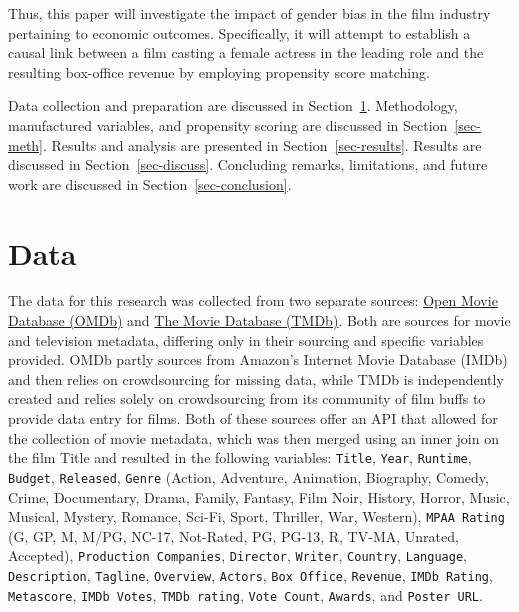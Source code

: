\documentclass[
]{agujournal2019}
\begin{document}
Thus, this paper will investigate the impact of gender bias in the film
industry pertaining to economic outcomes. Specifically, it will attempt
to establish a causal link between a film casting a female actress in
the leading role and the resulting box-office revenue by employing
propensity score matching.

Data collection and preparation are discussed in Section~\ref{sec-data}.
Methodology, manufactured variables, and propensity scoring are
discussed in Section~\ref{sec-meth}. Results and analysis are presented
in Section~\ref{sec-results}. Results are discussed in
Section~\ref{sec-discuss}. Concluding remarks, limitations, and future
work are discussed in Section~\ref{sec-conclusion}.

\section{Data}\label{sec-data}

The data for this research was collected from two separate sources:
\href{https://www.omdbapi.com/}{Open Movie Database (OMDb)} and
\href{https://www.themoviedb.org/}{The Movie Database (TMDb)}. Both are
sources for movie and television metadata, differing only in their
sourcing and specific variables provided. OMDb partly sources from
Amazon's Internet Movie Database (IMDb) and then relies on crowdsourcing
for missing data, while TMDb is independently created and relies solely
on crowdsourcing from its community of film buffs to provide data entry
for films. Both of these sources offer an API that allowed for the
collection of movie metadata, which was then merged using an inner join
on the film Title and resulted in the following variables:
\texttt{Title}, \texttt{Year}, \texttt{Runtime}, \texttt{Budget},
\texttt{Released}, \texttt{Genre} (Action, Adventure, Animation,
Biography, Comedy, Crime, Documentary, Drama, Family, Fantasy, Film
Noir, History, Horror, Music, Musical, Mystery, Romance, Sci-Fi, Sport,
Thriller, War, Western), \texttt{MPAA\ Rating} (G, GP, M, M/PG, NC-17,
Not-Rated, PG, PG-13, R, TV-MA, Unrated, Accepted),
\texttt{Production\ Companies}, \texttt{Director}, \texttt{Writer},
\texttt{Country}, \texttt{Language}, \texttt{Description},
\texttt{Tagline}, \texttt{Overview}, \texttt{Actors},
\texttt{Box\ Office}, \texttt{Revenue}, \texttt{IMDb\ Rating},
\texttt{Metascore}, \texttt{IMDb\ Votes}, \texttt{TMDb\ rating},
\texttt{Vote\ Count}, \texttt{Awards}, and \texttt{Poster\ URL}.
\end{document}
